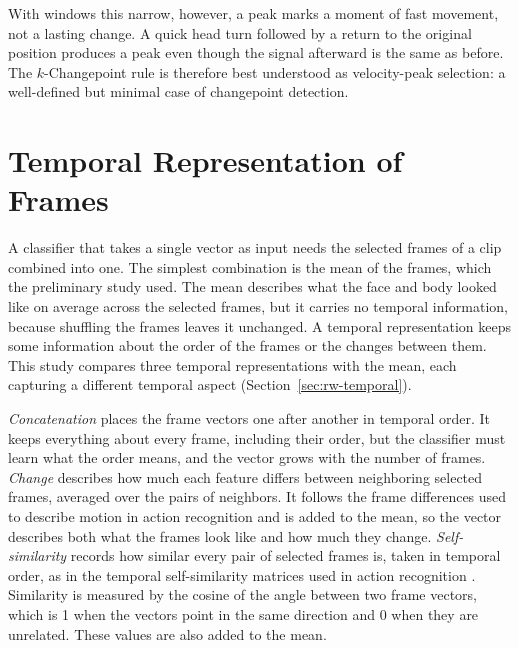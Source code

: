 With windows this narrow, however, a peak marks a moment of fast movement, not a lasting change. A quick head turn followed by a return to the original position produces a peak even though the signal afterward is the same as before. The $k$-Changepoint rule is therefore best understood as velocity-peak selection: a well-defined but minimal case of changepoint detection.



\section{Temporal Representation of Frames}
\label{sec:temporal}

A classifier that takes a single vector as input needs the selected frames of a clip combined into one. The simplest combination is the mean of the frames, which the preliminary study used. The mean describes what the face and body looked like on average across the selected frames, but it carries no temporal information, because shuffling the frames leaves it unchanged. A temporal representation keeps some information about the order of the frames or the changes between them. This study compares three temporal representations with the mean, each capturing a different temporal aspect (Section~\ref{sec:rw-temporal}).

\emph{Concatenation} places the frame vectors one after another in temporal order. It keeps everything about every frame, including their order, but the classifier must learn what the order means, and the vector grows with the number of frames. \emph{Change} describes how much each feature differs between neighboring selected frames, averaged over the pairs of neighbors. It follows the frame differences used to describe motion in action recognition \cite{wang2016} and is added to the mean, so the vector describes both what the frames look like and how much they change. \emph{Self-similarity} records how similar every pair of selected frames is, taken in temporal order, as in the temporal self-similarity matrices used in action recognition \cite{junejo2011}. Similarity is measured by the cosine of the angle between two frame vectors, which is 1 when the vectors point in the same direction and 0 when they are unrelated. These values are also added to the mean.

